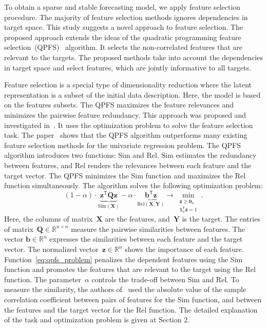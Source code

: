 \documentclass[preprint,authoryear,12pt]{elsarticle}
\theoremstyle{definition}
\newcommand{\bz}{\mathbf{z}}
\newcommand{\bb}{\mathbf{b}}
\newcommand{\bY}{\mathbf{Y}}
\newcommand{\bX}{\mathbf{X}}
\newcommand{\bQ}{\mathbf{Q}}
\newcommand{\bbR}{\mathbb{R}}
\newcommand{\T}{\mathsf{T}}
\newcommand{\bnu}{\boldsymbol{\nu}}
\newcommand{\bOne}{\boldsymbol{1}}
\newcommand{\bZero}{\boldsymbol{0}}
\begin{document}
To obtain a sparse and stable forecasting model, we apply feature selection procedure. The majority of feature selection methods ignores dependencies in target space. This study suggests a novel approach to feature selection. The proposed approach extends the ideas of the quadratic programming feature selection~(QPFS)~\citep{rodriguez2010quadratic} algorithm. It selects the non-correlated features that are relevant to the targets.  The proposed methods take into account the dependencies in target space and select features, which are jointly informative to all targets.
 
Feature selection is a special type of dimensionality reduction where the latent representation is a subset of the initial data description. 
Here, the model is based on the features subsets. 
The QPFS maximizes the feature relevances and minimizes the pairwise feature redundancy. 
This approach was proposed and investigated in~\citep{ding2005minimum,yamada2014high}.
It uses the optimization problem to solve the feature selection task. The paper~\citep{katrutsa2017comprehensive} shows that the QPFS algorithm outperforms many existing feature selection methods for the univariate regression problem. 
The QPFS algorithm introduces two functions: $\text{Sim}$ and $\text{Rel}$.
$\text{Sim}$ estimates the redundancy between features, and $\text{Rel}$ renders the relevances between each feature and the target vector.
The QPFS minimizes the Sim function and maximizes the Rel function simultaneously.
The algorithm solves the following optimization problem:
\begin{equation}
(1 - \alpha) \cdot \underbrace{\bz^{\T} \bQ \bz}_{\text{Sim}(\bX)} - \alpha \cdot \underbrace{ \bb^{\T} \bz}_{\text{Rel} (\bX, \bY)}%
\rightarrow \min_{\substack{\bz \geq \bZero_n \\ \bOne_n^{\T} \bz=1}}.
\label{eq:qpfs_problem}
\end{equation}
Here, the columns of matrix~$\bX$ are the features, and~$\bY$ %
is the target. 
The entries of matrix~$\bQ \in \bbR^{n \times n}$ measure the pairwise similarities between features.
The vector $\bb \in \bbR^n$ expresses the similarities between each feature and the target vector.
The normalized vector~$\bz \in \bbR^n$ shows the importance of each feature.
Function~\eqref{eq:qpfs_problem} penalizes the dependent features using the Sim function and promotes the features that are relevant to the target using the Rel function.
The parameter~$\alpha$ controls the trade-off between Sim and Rel.
To measure the similarity, the authors of~\citep{rodriguez2010quadratic} used the absolute value of the sample correlation coefficient between pairs of features for the Sim function, and between the features and the target vector for the Rel function. {\color{red} The detailed explanation of the task and optimization problem is given at Section 2.}
\end{document}
